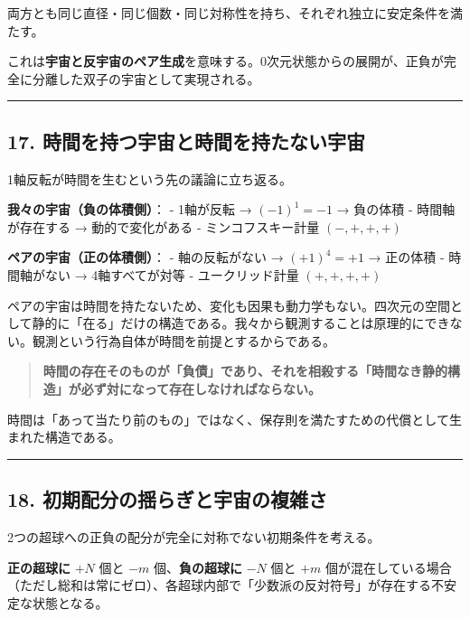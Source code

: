 \documentclass[a4paper,11pt]{ltjsarticle}
\theoremstyle{definition}
\begin{document}
両方とも同じ直径・同じ個数・同じ対称性を持ち、それぞれ独立に安定条件を満たす。

これは\textbf{宇宙と反宇宙のペア生成}を意味する。0次元状態からの展開が、正負が完全に分離した双子の宇宙として実現される。

\begin{center}\rule{0.5\linewidth}{0.5pt}\end{center}

\subsection{17.
時間を持つ宇宙と時間を持たない宇宙}\label{ux6642ux9593ux3092ux6301ux3064ux5b87ux5b99ux3068ux6642ux9593ux3092ux6301ux305fux306aux3044ux5b87ux5b99}

1軸反転が時間を生むという先の議論に立ち返る。

\textbf{我々の宇宙（負の体積側）}： - 1軸が反転 → \((-1)^1 = -1\) →
負の体積 - 時間軸が存在する → 動的で変化がある - ミンコフスキー計量
\((-,+,+,+)\)

\textbf{ペアの宇宙（正の体積側）}： - 軸の反転がない → \((+1)^4 = +1\) →
正の体積 - 時間軸がない → 4軸すべてが対等 - ユークリッド計量
\((+,+,+,+)\)

ペアの宇宙は時間を持たないため、変化も因果も動力学もない。四次元の空間として静的に「在る」だけの構造である。我々から観測することは原理的にできない。観測という行為自体が時間を前提とするからである。

\begin{quote}
\textbf{時間の存在そのものが「負債」であり、それを相殺する「時間なき静的構造」が必ず対になって存在しなければならない。}
\end{quote}

時間は「あって当たり前のもの」ではなく、保存則を満たすための代償として生まれた構造である。

\begin{center}\rule{0.5\linewidth}{0.5pt}\end{center}

\subsection{18.
初期配分の揺らぎと宇宙の複雑さ}\label{ux521dux671fux914dux5206ux306eux63faux3089ux304eux3068ux5b87ux5b99ux306eux8907ux96d1ux3055}

2つの超球への正負の配分が完全に対称でない初期条件を考える。

\textbf{正の超球に} \(+N\) 個と \(-m\) 個、\textbf{負の超球に} \(-N\)
個と \(+m\)
個が混在している場合（ただし総和は常にゼロ）、各超球内部で「少数派の反対符号」が存在する不安定な状態となる。
\end{document}
